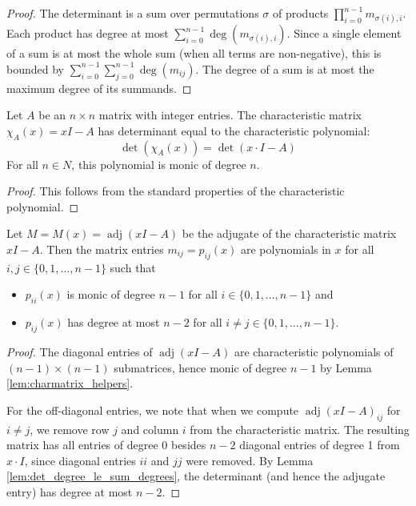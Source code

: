 \begin{proof}
The determinant is a sum over permutations $\sigma$ of products $\prod_{i=0}^{n-1} m_{\sigma(i),i}$.
Each product has degree at most $\sum_{i=0}^{n-1} \deg(m_{\sigma(i),i})$.
Since a single element of a sum is at most the whole sum (when all terms are non-negative), 
this is bounded by $\sum_{i=0}^{n-1} \sum_{j=0}^{n-1} \deg(m_{ij})$.
The degree of a sum is at most the maximum degree of its summands.
\end{proof}

\begin{lemma}
\label{lem:charmatrix_helpers}
\leanok
Let $A$ be an $n \times n$ matrix with integer entries. The characteristic matrix $\chi_A(x) = x I - A$ has determinant equal to the characteristic polynomial:
$$\det(\chi_A(x)) = \det(x \cdot I - A)$$
For all $n \in N$, this polynomial is monic of degree $n$.
\end{lemma}

\begin{proof}
This follows from the standard properties of the characteristic polynomial.
\end{proof}

\begin{lemma}
\label{lem:adj_poly}
Let $M = M(x) = \operatorname{adj}(x I - A)$ be the adjugate of the characteristic matrix $x I - A$.
Then the matrix entries $m_{ij} = p_{ij}(x)$ are polynomials in $x$ for all $i,j\in \{0,1,\ldots,n-1\}$ such that
\begin{itemize}
\item $p_{ii}(x)$ is monic of degree $n-1$ for all $i\in \{0,1,\ldots,n-1\}$ and
\item $p_{ij}(x)$ has degree at most $n-2$ for all $i\neq j\in \{0,1,\ldots,n-1\}$.
\end{itemize}
\end{lemma}

\begin{proof}
The diagonal entries of $\operatorname{adj}(x I - A)$ are characteristic polynomials of $(n-1) \times (n-1)$ submatrices, hence monic of degree $n-1$ by Lemma \ref{lem:charmatrix_helpers}. 

For the off-diagonal entries, we note that when we compute $\operatorname{adj}(x I - A)_{ij}$ for $i \neq j$, 
we remove row $j$ and column $i$ from the characteristic matrix. The resulting matrix has 
all entries of degree 0 besides $n-2$ diagonal entries of degree 1 from $x \cdot I$, since diagonal entries $ii$ and $jj$ were removed.
By Lemma \ref{lem:det_degree_le_sum_degrees}, the determinant (and hence the adjugate entry) has degree at most $n-2$.
\end{proof}

